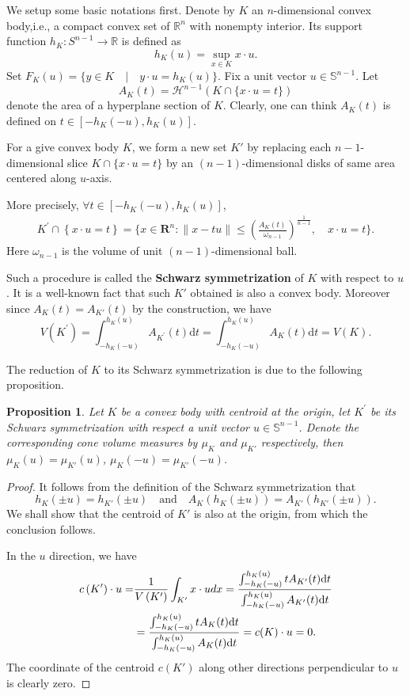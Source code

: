 \documentclass[12pt]{amsart}
\newtheorem{proposition}{Proposition}
\numberwithin{equation}{section}
\numberwithin{lemma}{section}
\numberwithin{proposition}{section}
\numberwithin{corollary}{section}
\numberwithin{remark}{section}
\begin{document}
We setup some basic notations first. Denote by $K$ an $n$-dimensional convex body,i.e., a compact convex set of $\mathbb{R}^n$ with nonempty interior.   
Its support function $h_K: S^{n-1}\to \mathbb{R}$ is defined as 
\[
h_K(u)=\sup_{x\in K} x\cdot u. 
\]
Set $F_K(u)=\{ y\in K\quad |\quad  y \cdot u=h_K(u)\}$. Fix a unit vector $u \in \mathbb{S}^{n-1}$. Let 
\[
A_K(t)=\mathcal{H}^{n-1}(K\cap \{x\cdot u=t\})
\] denote the area of a hyperplane section of $K$. 
Clearly, one can think $A_K(t)$ is defined on $t \in\left[-h_K(-u), h_K(u)\right]$. 

For a give convex body $K$, we form a new set $K'$ by replacing each $n-1$-dimensional slice $K\cap \{x\cdot u=t\}$ by an $(n-1)$-dimensional disks of same area centered along $u$-axis. 

More precisely, $\forall t \in\left[-h_K(-u), h_K(u)\right]$, 
\begin{align}
 K^{\prime} \cap\left\{ x \cdot u=t\right\} =\{x \in \mathbf{R}^n:\|x-t u\| \leq\left(\frac{A_K(t)}{\omega_{n-1}}\right)^{\frac{1}{n-1}},\quad  x \cdot u=t \}. 
\end{align}
Here $\omega_{n-1}$ is the volume of unit $(n-1)$-dimensional ball.

Such a procedure is called the \textbf{Schwarz symmetrization} of $K$ with respect to $u$. 
It is a well-known fact that such $K'$ obtained is also a convex body. 
Moreover since $A_{K}(t)=A_{K'}(t)$ by the construction, we have 
\[
V\left(K^{\prime}\right)=\int_{-h_K(-u)}^{h_K(u)} A_{K^{\prime}}(t) \mathrm{d} t=\int_{-h_K(-u)}^{h_K(u)} A_K(t) \mathrm{d} t=V(K).
\]

The reduction of $K$ to its Schwarz symmetrization is due to the following proposition. 

\begin{proposition} \label{P1}
    Let $K$ be a convex body with centroid at the origin, let $K^{\prime}$ be its Schwarz symmetrization with respect a unit vector $u\in\mathbb{S}^{n-1}$. Denote the corresponding cone volume measures by $\mu_K$ and $\mu_{K'}$ respectively, then 
$\mu_K( u)=\mu_{K'}( u)$, $\mu_K( -u)=\mu_{K'}( -u)$. 
\end{proposition}


\begin{proof}
It follows from the definition of the Schwarz symmetrization that 
\[
h_K(\pm u)=h_{K'}(\pm u) \quad \text{and} \quad A_{K}( h_K(\pm u))=A_{K'} (h_{K'}(\pm u)).
\]
We shall show that the centroid of $K'$ is also at the origin, from which the conclusion follows. 

In the $u$ direction, we have 
\begin{align} \notag
c\left(K^{\prime}\right) \cdot u=&\frac{1}{V\left(K^{\prime}\right)} \int_{K^{\prime}} x \cdot u d x=\frac{\int_{-h_K(-u)}^{h_K(u)} t A_{K^{\prime}}(t) \mathrm{d} t}{\int_{-h_K(-u)}^{h_K(u)} A_{K^{\prime}}(t) \mathrm{d} t} \\ \notag
&=\frac{\int_{-h_K(-u)}^{h_K(u)} t A_K(t) \mathrm{d} t}{\int_{-h_K(-u)}^{h_K(u)} A_K(t) \mathrm{d} t}=c(K) \cdot u=0. 
\end{align}
The coordinate of the centroid $c(K')$ along other directions perpendicular to $u$ is clearly zero.
\end{proof}
\end{document}
